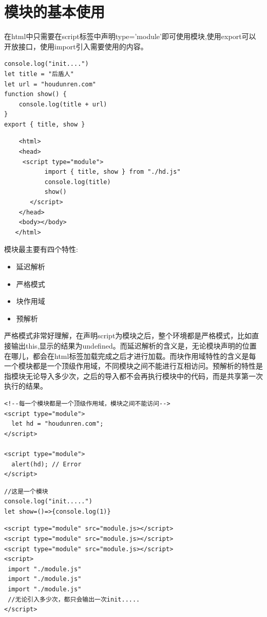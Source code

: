 \documentclass[
	11pt,
	fleqn,
	a4paper,
]{LegrandOrangeBook}
\begin{document}
\section{模块的基本使用}
在html中只需要在script标签中声明type='module'即可使用模块,使用export可以开放接口，使用import引入需要使用的内容。

\begin{verbatim}
console.log("init....")
let title = "后盾人"
let url = "houdunren.com"
function show() {
	console.log(title + url)
}
export { title, show }
\end{verbatim}

\begin{verbatim}
    <html>
    <head>
     <script type="module">
           import { title, show } from "./hd.js"
           console.log(title)
           show()
       </script>
    </head>
    <body></body>
   </html>
\end{verbatim}

模块最主要有四个特性:
\begin{itemize}
    \item 延迟解析
    \item 严格模式
    \item 块作用域
    \item 预解析
\end{itemize}
严格模式非常好理解，在声明script为模块之后，整个环境都是严格模式，比如直接输出this,显示的结果为undefined。而延迟解析的含义是，无论模块声明的位置在哪儿，都会在html标签加载完成之后才进行加载。而块作用域特性的含义是每一个模块都是一个顶级作用域，不同模块之间不能进行互相访问。预解析的特性是指模块无论导入多少次，之后的导入都不会再执行模块中的代码，而是共享第一次执行的结果。
\begin{verbatim}
<!--每一个模块都是一个顶级作用域，模块之间不能访问-->
<script type="module">
  let hd = "houdunren.com";
</script>

<script type="module">
  alert(hd); // Error
</script>
\end{verbatim}

\begin{verbatim}
//这是一个模块
console.log("init.....")
let show=()=>{console.log(1)}
\end{verbatim}
\begin{verbatim}
<script type="module" src="module.js></script>
<script type="module" src="module.js></script>
<script type="module" src="module.js></script>
<script>
 import "./module.js"
 import "./module.js"
 import "./module.js"
 //无论引入多少次，都只会输出一次init.....
</script>
\end{verbatim}
\end{document}
